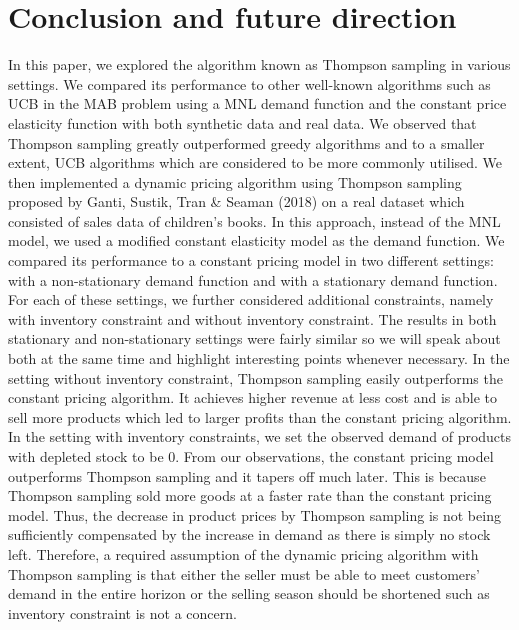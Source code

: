 \documentclass[a4paper]{article}
\begin{document}
\section{Conclusion and future direction}
In this paper, we explored the algorithm known as Thompson sampling in various settings. We compared its performance to other well-known algorithms such as UCB in the MAB problem using a MNL demand function and the constant price elasticity function with both synthetic data and real data. We observed that Thompson sampling greatly outperformed greedy algorithms and to a smaller extent, UCB algorithms which are considered to be more commonly utilised. 
\newline
\newline
We then implemented a dynamic pricing algorithm using Thompson sampling proposed by Ganti, Sustik, Tran \& Seaman (2018) on a real dataset which consisted of sales data of children's books. In this approach, instead of the MNL model, we used a modified constant elasticity model as the demand function. We compared its performance to a constant pricing model in two different settings: with a non-stationary demand function and with a stationary demand function. For each of these settings, we further considered additional constraints, namely with inventory constraint and without inventory constraint. The results in both stationary and non-stationary settings were fairly similar so we will speak about both at the same time and highlight interesting points whenever necessary. 
\newline
\newline
In the setting without inventory constraint, Thompson sampling easily outperforms the constant pricing algorithm. It achieves higher revenue at less cost and is able to sell more products which led to larger profits than the constant pricing algorithm. In the setting with inventory constraints, we set the observed demand of products with depleted stock to be 0. From our observations, the constant pricing model outperforms Thompson sampling and it tapers off much later. This is because Thompson sampling sold more goods at a faster rate than the constant pricing model. Thus, the decrease in product prices by Thompson sampling is not being sufficiently compensated by the increase in demand as there is simply no stock left. Therefore, a required assumption of the dynamic pricing algorithm with Thompson sampling is that either the seller must be able to meet customers' demand in the entire horizon or the selling season should be shortened such as inventory constraint is not a concern.
\end{document}
